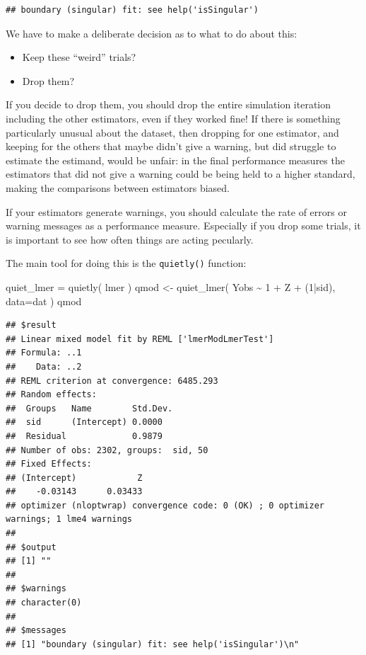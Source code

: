 \documentclass[
]{book}
\newenvironment{Shaded}{\begin{snugshade}}{\end{snugshade}}
\newcommand{\AttributeTok}[1]{\textcolor[rgb]{0.77,0.63,0.00}{#1}}
\newcommand{\DecValTok}[1]{\textcolor[rgb]{0.00,0.00,0.81}{#1}}
\newcommand{\FunctionTok}[1]{\textcolor[rgb]{0.00,0.00,0.00}{#1}}
\newcommand{\NormalTok}[1]{#1}
\newcommand{\OtherTok}[1]{\textcolor[rgb]{0.56,0.35,0.01}{#1}}
\newcommand{\SpecialCharTok}[1]{\textcolor[rgb]{0.00,0.00,0.00}{#1}}
\providecommand{\tightlist}{%
  \setlength{\itemsep}{0pt}\setlength{\parskip}{0pt}}
\begin{document}
\begin{verbatim}
## boundary (singular) fit: see help('isSingular')
\end{verbatim}

We have to make a deliberate decision as to what to do about this:

\begin{itemize}
\tightlist
\item
  Keep these ``weird'' trials?
\item
  Drop them?
\end{itemize}

If you decide to drop them, you should drop the entire simulation iteration including the other estimators, even if they worked fine!
If there is something particularly unusual about the dataset, then dropping for one estimator, and keeping for the others that maybe didn't give a warning, but did struggle to estimate the estimand, would be unfair: in the final performance measures the estimators that did not give a warning could be being held to a higher standard, making the comparisons between estimators biased.

If your estimators generate warnings, you should calculate the rate of errors or warning messages as a performance measure.
Especially if you drop some trials, it is important to see how often things are acting pecularly.

The main tool for doing this is the \texttt{quietly()} function:

\begin{Shaded}
\begin{Highlighting}[]
\NormalTok{quiet\_lmer }\OtherTok{=} \FunctionTok{quietly}\NormalTok{( lmer )}
\NormalTok{qmod }\OtherTok{\textless{}{-}} \FunctionTok{quiet\_lmer}\NormalTok{( Yobs }\SpecialCharTok{\textasciitilde{}} \DecValTok{1} \SpecialCharTok{+}\NormalTok{ Z }\SpecialCharTok{+}\NormalTok{ (}\DecValTok{1}\SpecialCharTok{|}\NormalTok{sid), }\AttributeTok{data=}\NormalTok{dat )}
\NormalTok{qmod}
\end{Highlighting}
\end{Shaded}

\begin{verbatim}
## $result
## Linear mixed model fit by REML ['lmerModLmerTest']
## Formula: ..1
##    Data: ..2
## REML criterion at convergence: 6485.293
## Random effects:
##  Groups   Name        Std.Dev.
##  sid      (Intercept) 0.0000  
##  Residual             0.9879  
## Number of obs: 2302, groups:  sid, 50
## Fixed Effects:
## (Intercept)            Z  
##    -0.03143      0.03433  
## optimizer (nloptwrap) convergence code: 0 (OK) ; 0 optimizer warnings; 1 lme4 warnings 
## 
## $output
## [1] ""
## 
## $warnings
## character(0)
## 
## $messages
## [1] "boundary (singular) fit: see help('isSingular')\n"
\end{verbatim}
\end{document}
